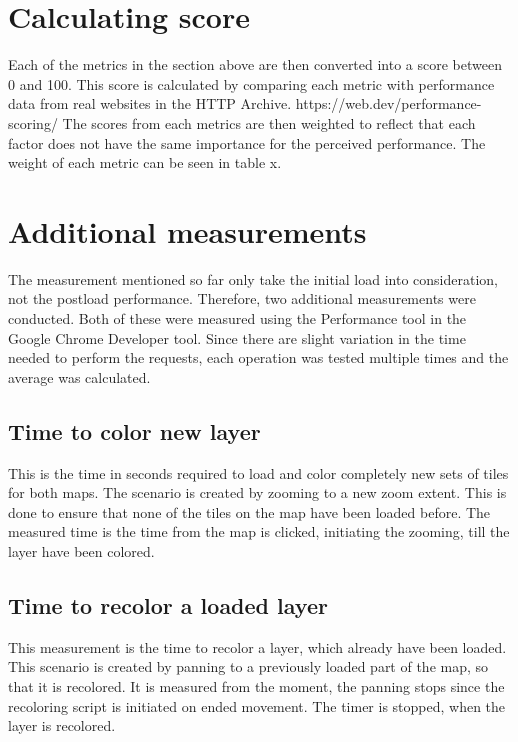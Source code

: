 \section{Calculating score}

Each of the metrics in the section above are then converted into a score between 0 and 100. This score is calculated by comparing each metric with performance data from real websites in the HTTP Archive.
https://web.dev/performance-scoring/
The scores from each metrics are then weighted to reflect that each factor does not have the same importance for the perceived performance. The weight of each metric can be seen in table x.


\section{Additional measurements}

The measurement mentioned so far only take the initial load into consideration, not the postload performance. 
Therefore, two additional measurements were conducted. Both of these were measured using the Performance tool in the Google Chrome Developer tool. Since there are slight variation in the time needed to perform the requests, each operation was tested multiple times and the average was calculated. 
\subsection{Time to color new layer}
This is the time in seconds required to load and color completely new sets of tiles for both maps. The scenario is created by zooming to a new zoom extent. This is done to ensure that none of the tiles on the map have been loaded before. The measured time is the time from the map is clicked, initiating the zooming, till the layer have been colored.

\subsection{Time to recolor a loaded layer}
This measurement is the time to recolor a layer, which already have been loaded. This scenario is created by panning to a previously loaded part of the map, so that it is recolored. 
It is measured from the moment, the panning stops since the recoloring script is initiated on ended movement. The timer is stopped, when the layer is recolored.

